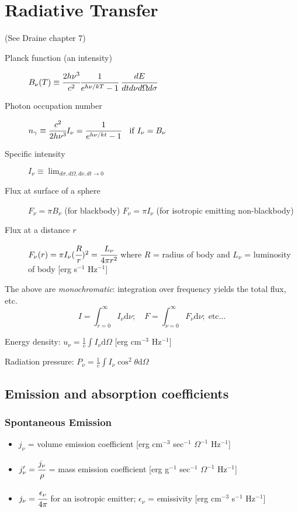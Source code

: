 \documentclass[11pt]{article}
\newcommand{\mar}[1]{\hspace{0pt}\marginpar{-\textcolor{black}{#1}-}}
\begin{document}
\newpage
\section{Radiative Transfer}
\mar{24}(See Draine chapter 7)
\begin{description}%
    \item [Planck function (an intensity)]
        $ B_{\nu}(T) \equiv
        \cfrac{2h{\nu}^{3}}{c^{2}} \cfrac{1}{e^{h{\nu}/kT}-1} \;
        \cfrac{dE}{dt d\nu d\Omega d\sigma} $
    \item [Photon occupation number]
        $ n_{\gamma} \equiv \cfrac{c^{2}}{2h{\nu}^{3}} I_{\nu}
          = \cfrac{1}{e^{h{\nu}/kt} - 1} \quad \mathrm{if}\; I_{\nu} = B_{\nu} $
    \item [Specific intensity]
        $ I_{\nu} \equiv \lim_{d\sigma, d\Omega, d\nu, dt \to 0} $
    \item [Flux at surface of a sphere]
        $ F_{\nu} = \pi{B_{\nu}} $
        (for blackbody)\newline
        $ F_{\nu} = \pi{I_{\nu}} $
        (for isotropic emitting non-blackbody)
    \item [Flux at a distance $r$]
        $ F_{\nu}(r) = \pi{I_{\nu}}(\cfrac{R}{r})^{2}
        = \cfrac{L_{\nu}}{4\pi{r^{2}}}$ \newline
        where $R$ = radius of body and \newline
        $L_{\nu}$ = luminosity of body
        [erg s$^{-1}$ Hz$^{-1}$]
\end{description}


\mar{25}The above are \textit{monochromatic}: integration over frequency
yields the total flux, etc.
\[
    I = \int_{r=0}^{\infty} I_{\nu} \mathrm{d}\nu; \quad
    F = \int_{\nu=0}^{\infty} F_{\nu} \mathrm{d}\nu; \;\mathrm{etc\ldots}
    \]

Energy density:
$u_{\nu} = \frac{1}{c}\int{I_{\nu}\mathrm{d}\Omega}$ [erg cm$^{-3}$
Hz$^{-1}$]

Radiation pressure:
$P_{\nu} = \frac{1}{c}\int{I_{\nu}\cos^{2}\theta\mathrm{d}\Omega}$

\newpage
\subsection{Emission and absorption coefficients}
\subsubsection{Spontaneous Emission}
\begin{itemize}[label={}, itemsep=0ex]
    \item $j_{\nu}$ = volume emission coefficient
        [erg cm$^{-3}$ sec$^{-1}$ $\Omega^{-1}$ Hz$^{-1}$]
    \item $j'_{\nu} = \cfrac{j_{\nu}}{\rho}$ = mass emission coefficient
        [erg g$^{-1}$ sec$^{-1}$ $\Omega^{-1}$ Hz$^{-1}$]
    \item $j_{\nu} = \cfrac{\epsilon_{\nu}}{4\pi}$ for an isotropic
        emitter;
        $\epsilon_{\nu}$ = emissivity [erg cm$^{-3}$ s$^{-1}$ Hz$^{-1}$]
\end{itemize}
\end{document}
